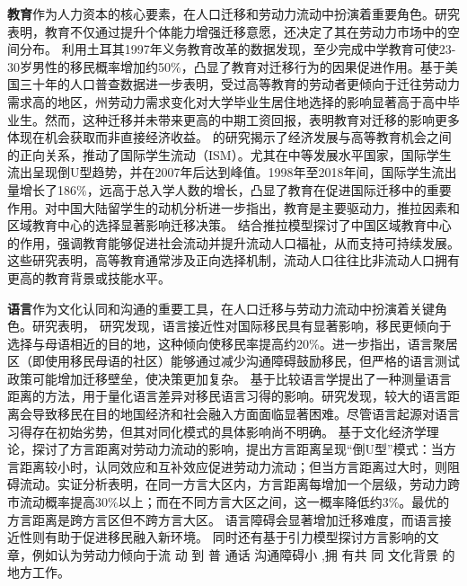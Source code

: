 \documentclass[a4paper,12pt,oneside, fontset=mac]{ctexbook} %
\begin{document}
\textbf{教育}作为人力资本的核心要素，在人口迁移和劳动力流动中扮演着重要角色。研究表明，教育不仅通过提升个体能力增强迁移意愿，还决定了其在劳动力市场中的空间分布。
\cite{aydemirEffectEducationInternal2022}利用土耳其1997年义务教育改革的数据发现，至少完成中学教育可使23-30岁男性的移民概率增加约50\%，凸显了教育对迁移行为的因果促进作用。\cite{wozniakAreCollegeGraduates2010}基于美国三十年的人口普查数据进一步表明，受过高等教育的劳动者更倾向于迁往劳动力需求高的地区，州劳动力需求变化对大学毕业生居住地选择的影响显著高于高中毕业生。然而，这种迁移并未带来更高的中期工资回报，表明教育对迁移的影响更多体现在机会获取而非直接经济收益。
\cite{weberStudentMigrationTransition2023}的研究揭示了经济发展与高等教育机会之间的正向关系，推动了国际学生流动（ISM）。尤其在中等发展水平国家，国际学生流出呈现倒U型趋势，并在2007年后达到峰值。1998年至2018年间，国际学生流出量增长了186\%，远高于总入学人数的增长，凸显了教育在促进国际迁移中的重要作用。\cite{jianiWhyHowInternational2017}对中国大陆留学生的动机分析进一步指出，教育是主要驱动力，推拉因素和区域教育中心的选择显著影响迁移决策。
\cite{wenEmergenceRegionalEducation2019}结合推拉模型探讨了中国区域教育中心的作用，强调教育能够促进社会流动并提升流动人口福祉，从而支持可持续发展。这些研究表明，高等教育通常涉及正向选择机制，流动人口往往比非流动人口拥有更高的教育背景或技能水平。

\textbf{语言}作为文化认同和沟通的重要工具，在人口迁移与劳动力流动中扮演着关键角色。研究表明，
\cite{adseraRoleLanguageShaping2015}研究发现，语言接近性对国际移民具有显著影响，移民更倾向于选择与母语相近的目的地，这种倾向使移民率提高约20\%。\cite{bauerEnclavesLanguageLocation2005}进一步指出，语言聚居区（即使用移民母语的社区）能够通过减少沟通障碍鼓励移民，但严格的语言测试政策可能增加迁移壁垒，使决策更加复杂。
\cite{isphordingLinguisticBarriersDestination2014}基于比较语言学提出了一种测量语言距离的方法，用于量化语言差异对移民语言习得的影响。研究发现，较大的语言距离会导致移民在目的地国经济和社会融入方面面临显著困难。尽管语言起源对语言习得存在初始劣势，但其对同化模式的具体影响尚不明确。
\cite{LiuYuYunLaoDongLiKuaFangYanLiuDongDeDaoUXingMoShi2015}基于文化经济学理论，探讨了方言距离对劳动力流动的影响，提出方言距离呈现“倒U型”模式：当方言距离较小时，认同效应和互补效应促进劳动力流动；但当方言距离过大时，则阻碍流动。实证分析表明，在同一方言大区内，方言距离每增加一个层级，劳动力跨市流动概率提高30\%以上；而在不同方言大区之间，这一概率降低约3\%。最优的方言距离是跨方言区但不跨方言大区。
语言障碍会显著增加迁移难度，而语言接近性则有助于促进移民融入新环境。
同时还有基于引力模型探讨方言影响的文章，例如\cite{LiQinFangYanPuTongHuaYuZhongGuoLaoDongLiQuYuLiuDong2014}认为劳动力倾向于流 动 到 普 通话  沟通障碍小 ,拥 有共 同 文化背景 的 地方工作。
\end{document}
